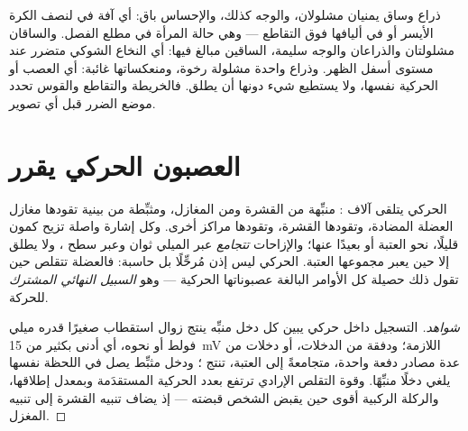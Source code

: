 \begin{example}\label{ex:g12:brain-and-movement:paralysis}
ذراع وساق يمنيان مشلولان، والوجه كذلك، والإحساس باق: أي آفة في  لنصف الكرة الأيسر أو في أليافها فوق التقاطع --- وهي حالة
المرأة في مطلع الفصل. والساقان مشلولتان والذراعان والوجه سليمة،
 الساقين مبالغ فيها: أي النخاع الشوكي متضرر عند مستوى أسفل
الظهر. وذراع واحدة مشلولة رخوة، ومنعكساتها غائبة: أي العصب أو
 الحركية نفسها، ولا يستطيع شيء دونها أن يطلق. فالخريطة
والتقاطع والقوس تحدد موضع الضرر قبل أي تصوير.
\end{example}

\section{العصبون الحركي يقرر}

\begin{proposition}\label{prop:g12:brain-and-movement:integration}
 الحركي يتلقى آلاف : منبِّهة من القشرة ومن المغازل،
ومثبِّطة من  بينية تقودها مغازل العضلة المضادة، وتقودها القشرة،
وتقودها مراكز أخرى. وكل إشارة واصلة تزيح كمون  قليلًا، نحو
العتبة أو بعيدًا عنها؛ والإزاحات \emph{تتجامع} عبر الميلي ثوان وعبر سطح
، ولا يطلق  إلا حين يعبر مجموعها العتبة.  الحركي
ليس إذن مُرحِّلًا بل حاسبة: فالعضلة تتقلص حين تقول ذلك حصيلة كل الأوامر
البالغة عصبوناتها الحركية --- وهو \emph{السبيل النهائي
المشترك} للحركة.
\end{proposition}
\begin{proof}[شواهد]
التسجيل داخل  حركي يبين كل دخل منبِّه ينتج زوال استقطاب صغيرًا قدره
ميلي فولط أو نحوه، أي أدنى بكثير من \qty{15}{mV} اللازمة؛ ودفقة من
الدخلات، أو دخلات من عدة مصادر دفعة واحدة، متجامعةً إلى العتبة، تنتج
؛ ودخل مثبِّط يصل في اللحظة نفسها يلغي دخلًا منبِّهًا. وقوة
التقلص الإرادي ترتفع بعدد  الحركية المستقدَمة وبمعدل إطلاقها،
والركلة الركبية أقوى حين يقبض الشخص قبضته --- إذ يضاف تنبيه القشرة إلى
تنبيه المغزل.
\end{proof}

